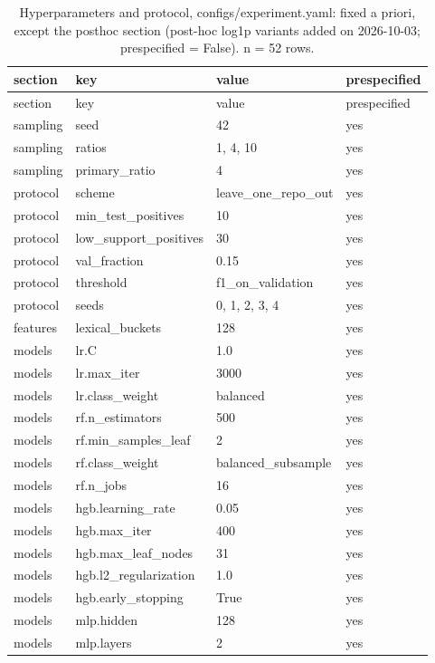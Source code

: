 {\small
\begin{longtable}{llll}
\caption{Hyperparameters and protocol, configs/experiment.yaml: fixed a priori, except the posthoc section (post-hoc log1p variants added on 2026-10-03; prespecified = False). n = 52 rows.}\label{tab:config_hyperparameters}\\
\toprule
section & key & value & prespecified \\
\midrule
\endfirsthead
\toprule
section & key & value & prespecified \\
\midrule
\endhead
\bottomrule
\endfoot
sampling & seed & 42 & yes \\
sampling & ratios & 1, 4, 10 & yes \\
sampling & primary\_ratio & 4 & yes \\
protocol & scheme & leave\_one\_repo\_out & yes \\
protocol & min\_test\_positives & 10 & yes \\
protocol & low\_support\_positives & 30 & yes \\
protocol & val\_fraction & 0.15 & yes \\
protocol & threshold & f1\_on\_validation & yes \\
protocol & seeds & 0, 1, 2, 3, 4 & yes \\
features & lexical\_buckets & 128 & yes \\
models & lr.C & 1.0 & yes \\
models & lr.max\_iter & 3000 & yes \\
models & lr.class\_weight & balanced & yes \\
models & rf.n\_estimators & 500 & yes \\
models & rf.min\_samples\_leaf & 2 & yes \\
models & rf.class\_weight & balanced\_subsample & yes \\
models & rf.n\_jobs & 16 & yes \\
models & hgb.learning\_rate & 0.05 & yes \\
models & hgb.max\_iter & 400 & yes \\
models & hgb.max\_leaf\_nodes & 31 & yes \\
models & hgb.l2\_regularization & 1.0 & yes \\
models & hgb.early\_stopping & True & yes \\
models & mlp.hidden & 128 & yes \\
models & mlp.layers & 2 & yes \\

\end{longtable}}
